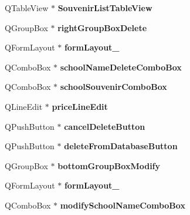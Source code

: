 \begin{DoxyCompactItemize}
Q\+Table\+View $\ast$ {\bfseries Souvenir\+List\+Table\+View}
\item 
\mbox{\label{class_ui__admin_window_a16cd5c41715adb2b0656f31d6d135d46}} 
Q\+Group\+Box $\ast$ {\bfseries right\+Group\+Box\+Delete}
\item 
\mbox{\label{class_ui__admin_window_a4763f9ce7722f0963ab46fa5acd60156}} 
Q\+Form\+Layout $\ast$ {\bfseries form\+Layout\+\_}
\item 
\mbox{\label{class_ui__admin_window_a6294e134e052226694b08fd82b4cabb7}} 
Q\+Combo\+Box $\ast$ {\bfseries school\+Name\+Delete\+Combo\+Box}
\item 
\mbox{\label{class_ui__admin_window_a7b397a5af6bdfa410ed1a5d1b49b005e}} 
Q\+Combo\+Box $\ast$ {\bfseries school\+Souvenir\+Combo\+Box}
\item 
\mbox{\label{class_ui__admin_window_ade49b87dc35ab33cfc53e9ac852d0ec3}} 
Q\+Line\+Edit $\ast$ {\bfseries price\+Line\+Edit}
\item 
\mbox{\label{class_ui__admin_window_a75ec7e24f6d42215b5741cbe1189e759}} 
Q\+Push\+Button $\ast$ {\bfseries cancel\+Delete\+Button}
\item 
\mbox{\label{class_ui__admin_window_a8a512c997c5a499a7650f78936e6a173}} 
Q\+Push\+Button $\ast$ {\bfseries delete\+From\+Database\+Button}
\item 
\mbox{\label{class_ui__admin_window_a43ba0515bb6c65c4fb5327ef01464779}} 
Q\+Group\+Box $\ast$ {\bfseries bottom\+Group\+Box\+Modify}
\item 
\mbox{\label{class_ui__admin_window_ad26af6143ed777d4e8510defe3ad7225}} 
Q\+Form\+Layout $\ast$ {\bfseries form\+Layout\+\_}
\item 
\mbox{\label{class_ui__admin_window_a5dc69a9e57bb2522875abf159c9c63e3}} 
Q\+Combo\+Box $\ast$ {\bfseries modify\+School\+Name\+Combo\+Box}
\item 

\end{DoxyCompactItemize}
